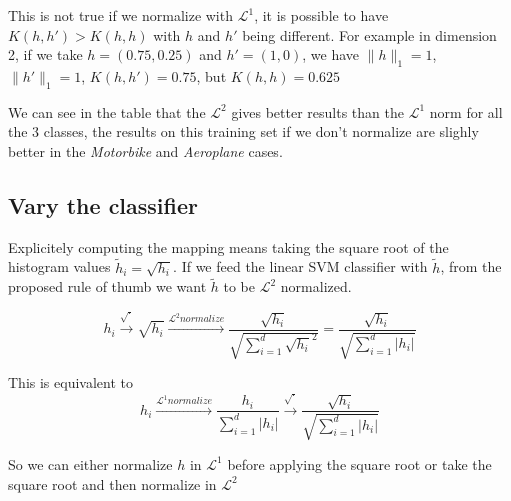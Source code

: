 \documentclass{article}
\begin{document}
This is not true if we normalize with $\mathcal{L}^1$, it is possible
to have $K(h, h') > K(h, h)$ with $h$ and $h'$ being different.
For example in dimension 2, if we take $h = (0.75, 0.25)$ and
$h' = (1, 0)$, we have $\|h\|_1 = 1$, $\|h'\|_1 = 1$,
$K(h, h') = 0.75$, but $K(h, h) = 0.625$



We can see in the table that the $\mathcal{L}^2$ gives better
results than the $\mathcal{L}^1$ norm for all the 3 classes, the
results on this training set if we don't normalize are slighly
better in the \emph{Motorbike} and \emph{Aeroplane} cases.


\subsection{Vary the classifier}


Explicitely computing the mapping means taking the square root of the
histogram values $\tilde{h}_i = \sqrt{h_i}$. If we feed the linear SVM
classifier with $\tilde{h}$, from the proposed rule of thumb we want
$\tilde{h}$ to be $\mathcal{L}^2$ normalized.

\begin{equation*}
  h_i \xrightarrow{\sqrt{.}} \sqrt{h_i} \xrightarrow{\mathcal{L}^2 normalize} \dfrac{\sqrt{h_i}}{\sqrt{\sum_{i = 1}^d \sqrt{h_i}^2}} = \dfrac{\sqrt{h_i}}{\sqrt{\sum_{i = 1}^d |h_i|}}
\end{equation*}

This is equivalent to
\begin{equation*}
  h_i \xrightarrow{\mathcal{L}^1 normalize} \dfrac{h_i}{\sum_{i = 1}^d |h_i|} \xrightarrow{\sqrt{.}} \dfrac{\sqrt{h_i}}{\sqrt{\sum_{i = 1}^d |h_i|}}
\end{equation*}

So we can either normalize $h$ in $\mathcal{L}^1$ before applying the
square root or take the square root and then normalize in $\mathcal{L}^2$

\end{document}
